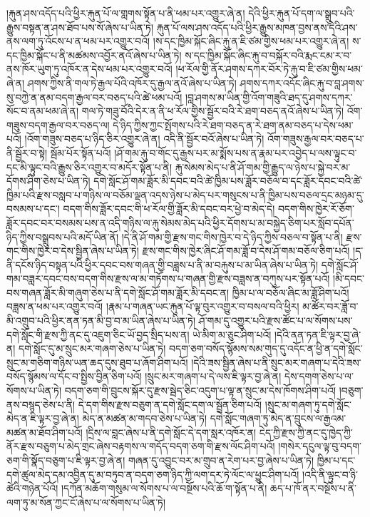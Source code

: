 །རྐུན་ཤས་འདོད་པའི་ཕྱིར་རྐུན་པོ་ལ་གླགས་སྟོན་པ་ནི་ཕམ་པར་འགྱུར་ཞེ་ན། དེའི་ཕྱིར་རྐུན་པོ་དག་ལ་སྒྲུབ་པའི་རྒྱུས་བསྟན་ན་ཤས་ཐོབ་པས་སོ་ཞེས་པ་ཡིན་ཏེ། རྐུན་པོ་ལས་ཤས་འདོད་པའི་ཕྱིར་རྒྱུས་མཁན་བྱས་ནས་དེའི་ཤས་ནས་ལག་ཏུ་འོངས་པ་ན་ཕམ་པར་འགྱུར་བའོ། །ས་དང་ཁྱིམ་སྐོང་ཞིང་རྐུ་ན་ཇི་ཙམ་གྱིས་ཕམ་པར་འགྱུར་ཞེ་ན། ས་དང་ཁྱིམ་སྐོང་པ་ནི་མཚམས་འབྱོར་ནའོ་ཞེས་པ་ཡིན་ཏེ། ས་དང་ཁྱིམ་སྐོང་ཞིང་རྐུ་བ་བསྐོར་བའི་རྨང་ངམ་ར་བ་ནས་ཁོར་ཡུག་ཏུ་འཁོར་ན་དེས་ཕམ་པར་འགྱུར་བའོ། །ཕ་རོལ་གྱི་ནོར་ཤགས་དཀར་བོར་ཏེ་རྐུ་བ་ཇི་ཙམ་གྱིས་ཕམ་ཞེ་ན། ཤགས་ཀྱིས་ནི་གལ་ཏེ་རྒྱལ་པོའི་འཁོར་དུ་རྒྱལ་ནའོ་ཞེས་པ་ཡིན་ཏེ། ཤགས་དཀར་འདོང་ཞིང་རྐུ་བ་བླ་ཤགས་སུ་བཀྱེ་ན་ནམ་བདག་རྒྱལ་བར་བཅད་པའི་ཚེ་ཕམ་པའོ། །བླ་ཤགས་མ་ཡིན་གྱི་འོག་གཟུའི་ཐད་དུ་ཤགས་དཀར་སོང་བ་ནམ་ཕམ་ཞེ་ན། གལ་ཏེ་གཟུ་བོའི་དེར་ན་ནི་ཕ་རོལ་གྱིས་སྦྱོར་བའི་རེ་ཐག་བཅད་ནའོ་ཞེས་པ་ཡིན་ཏེ། འོག་གཟུས་བདག་རྒྱལ་བར་བཅད་ལ། དེ་ཉིད་ཀྱིས་ཀྱང་སྤོགས་པའི་རེ་ཐག་བཅད་ན་རེ་ཐག་ནམ་བཅད་པ་དེས་ཕམ་པའོ། །འོག་གཟུས་བཅད་པ་ཉིད་ཅིར་འགྱུར་ཞེ་ན། འདི་ནི་སྦྱོར་བའོ་ཞེས་པ་ཡིན་ཏེ། འོག་གཟུས་རྒྱལ་བར་བཅད་པ་ནི་སྦྱོར་བ་སྟེ། སྦོམ་པོར་སྟོན་པའོ། །ཤོ་གམ་རྐུ་བ་གོང་དུ་རྒྱས་པར་མ་སྨོས་པས་ན་རྣམ་པར་འབྱེད་པ་ལས་ལྟུང་བ་དང་མི་ལྟུང་བའི་རྒྱུས་ཅིར་འགྱུར་བ་མདོར་སྟོན་པ་ནི། རྐུ་སེམས་མེད་པ་ནི་ཤོ་གམ་གྱི་རྒྱུད་ལ་ཉེས་པ་སྐྱེ་བར་མ་དོགས་ཤིག་ཅེས་པ་ཡིན་ཏེ། དགེ་སློང་ཤོ་གམ་ཟློར་མི་དབང་བའི་ཚེ་ཁྱིམ་པས་ཟློར་བཅོལ་བ་དང་ཟློར་དབང་བའི་ཚེ་ཁྱིམ་པའི་རྫས་བསླབ་པ་གཉིས་ལ་བཅོམ་ལྡན་འདས་ཉེས་པ་མེད་པར་གསུངས་པ་ནི་ཁྱིམ་པས་བཅལ་དྲང་མཉམ་དུ་བསམས་པ་དང་། བདག་གིས་ཟློར་དབང་གི་ཕ་རོལ་གྱི་ཟློར་མི་དབང་བར་ཕྱེ་བ་མེད་དེ། བདག་གིས་ཁྱེར་རོ་ཅོག་ཟློར་དབང་བར་བསམས་པས་ན་འདི་གཉིས་ལ་རྐུ་སེམས་མེད་པའི་ཕྱིར་དོགས་པ་མ་བསྐྱེད་ཅིག་པར་སློབ་དཔོན་ཉིད་ཀྱིས་བསྒྲུབས་པའི་མདོ་ཡིན་ནོ། །དེ་ནི་ཤོ་གམ་གྱི་རྫས་གང་གིས་ཁྱེར་བ་དེ་ཉིད་ཀྱིས་བཅལ་བ་སྟོན་པ་ནི། རྫས་གང་གིས་ཁྱེར་བ་དེས་སྦྱིན་ཞེས་པ་ཡིན་ཏེ། རྫས་གང་གིས་ཁྱེར་ཞིང་ཤོ་གམ་ཟློ་བ་དེས་ཤོ་གམ་བཅོལ་ཅིག་པའོ། །ད་ནི་དངོས་ཉིད་བསྟན་པའི་ཕྱིར་དབང་བས་གཞན་གྱི་བཟླས་པ་ནི་མ་བརྐུས་པ་མ་ཡིན་ཞེས་པ་ཡིན་ཏེ། དགེ་སློང་ཤོ་གམ་བཟླར་དབང་བས་བདག་གིས་རྫས་ལ་མ་གཏོགས་པ་གཞན་གྱི་རྫས་བཟླས་ན་བཀུས་པར་སྟོན་པའོ། །མི་དབང་བས་གཞན་ཟློར་མི་གཞུག་ཅེས་པ་ནི་དགེ་སློང་ཤོ་གམ་ཟློར་མི་དབང་ན། ཁྱིམ་པ་ལ་བཅོལ་ཞིང་མ་ཟློ་ཤིག་པའོ། བཟླས་ན་ཕམ་པར་འགྱུར་བའོ། །རྣམ་པ་གཞན་ཡང་རྐུན་པོ་ལྟ་བུར་འགྱུར་བ་བསལ་བའི་ཕྱིར། མ་ཚོར་བར་ཟློ་བ་མི་འགྲུབ་པའི་ཕྱིར་ནན་ཏན་མི་བྱ་བ་མ་ཡིན་ཞེས་པ་ཡིན་ཏེ། ཤོ་གམ་དུ་འགྱུར་པའི་རྫས་ཚོང་པ་ལ་སོགས་པས་དགེ་སློང་གི་རྫས་ཀྱི་ནང་དུ་འཇུག་ཅིང་ཡོ་བྱད་སྲིད་པས་ན། ཡེ་མིག་མ་ཅུང་ཤིག་པའོ། །དེའི་ནན་ཏན་ཇི་ལྟར་བྱ་ཞེ་ན། དགེ་སློང་དུ་མ་སྲུང་མར་གཞག་ཅེས་པ་ཡིན་ཏེ། བདག་ཅག་བསོད་སྙོམས་སམ་གུད་དུ་འདོང་ན་ཕྱི་ན་དགེ་སློང་སྲུང་མ་གཅིག་གཉིས་ཡན་ཆད་དུས་ཐུབ་པ་ཞོག་ཤིག་པའོ། །དེའི་ཟས་སྦྱིན་ཞེས་པ་ནི་སྲུང་མར་གཞག་པ་དེའི་ཟས་བསོད་སྙོམས་ལ་དོང་བ་སྤྱིས་བྱིན་ཅིག་པའོ། །སྲུང་མར་གཞག་པ་དེ་ལས་ཇི་ལྟར་བྱ་ཞེ་ན། དེས་དགག་ཅེས་པ་ལ་སོགས་པ་ཡིན་ཏེ། བདག་ཅག་གི་བྲུངས་སྐོར་དུ་རྫས་སྦེད་ཅིང་འདུག་པ་ལྟ་ན་སྲུང་མ་དེས་ཁོགས་ཤིག་པའོ། །བཅུག་ནས་བསྙད་ཅེས་པ་ནི། དེ་དག་གིས་རྫས་བཅུག་ན་དགེ་སློང་དག་ལ་སྦྲོན་ཅིག་པའོ། །སྲུང་མ་གཞག་ཏུ་དགེ་སློང་མེད་ན་ཇི་ལྟར་བྱ་ཞེ་ན། མེད་ན་མཚན་མ་གདབ་ཅེས་པ་ཡིན་ཏེ། དགེ་སློང་གཞག་ཏུ་མེད་ན་བྲུངས་ལ་རྒྱའམ་མཚན་མ་ཐོབ་ཤིག་པའོ། །དྲིས་ལ་བླང་ཞེས་པ་ནི་དགེ་སློང་དེ་དག་སླར་འཁོར་ན། ངེད་ཀྱི་རྫས་ཀྱི་ནང་དུ་ཁྱེད་ཀྱི་ནོར་རྫས་བཅུག་པ་མེད་གྲང་ཞེས་བརྟགས་ལ་གདོད་བདག་ཅག་གི་རྫས་ལོང་ཤིག་པའོ། །གསེར་དངུལ་ལྟ་བུ་བདག་ཅག་གི་སྣོད་བཅུག་པ་ཇི་ལྟར་བྱ་ཞེ་ན། གཞན་དུ་འབྱུང་བར་མ་གྲུབ་ན་རེག་པར་བྱ་ཞེས་པ་ཡིན་ཏེ། ཁྱིམ་པ་དང་དགེ་ཚུལ་མེད་དམ་འབྱིན་དུ་མ་བཏུབ་ན་བདག་ཅག་ཉིད་ཀྱི་ལག་དར་ཏེ་ལོང་ལ་ཕྱུང་ཤིག་པའོ། །འདི་ནི་ལྟུང་བ་ཉི་ཚེའི་གཉེན་པོའོ། །དཀོན་མཆོག་གསུམ་ལ་སོགས་པ་ལ་བསྔོས་པའི་ཆོ་ག་སྟོན་པ་ནི། ཆད་པ་ཁོ་ནར་བསྔོས་པ་ནི་ལག་ཏུ་མ་སོན་ཀྱང་ངོ་ཞེས་པ་ལ་སོགས་པ་ཡིན་ཏེ། 